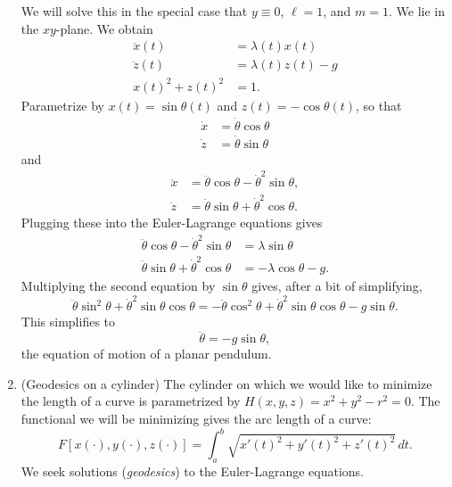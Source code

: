 \documentclass[11pt]{book}
\begin{document}
\begin{enumerate}
We will solve this in the special case that $y \equiv 0$, $\ell = 1$, and $m = 1$. We lie in the $xy$-plane. We obtain
\begin{align*}
\ddot{x}(t) &= \lambda(t)x(t) \\
\ddot{z}(t) &= \lambda(t)z(t) - g \\
x(t)^2 + z(t)^2 &= 1.
\end{align*}
Parametrize by $x(t) = \sin \theta(t)$ and $z(t) = -\cos \theta(t)$, so that
\begin{align*}
\dot{x} &= \dot{\theta} \cos \theta \\
\dot{z} &= \dot{\theta} \sin \theta
\end{align*}
and
\begin{align*}
\ddot{x} &= \ddot{\theta} \cos \theta - \dot{\theta}^2 \sin \theta, \\
\ddot{z} &= \ddot{\theta} \sin \theta + \dot{\theta}^2 \cos \theta.
\end{align*}
Plugging these into the Euler-Lagrange equations gives
\begin{align*}
\ddot{\theta} \cos \theta - \dot{\theta}^2 \sin \theta &= \lambda \sin \theta \\
\ddot{\theta} \sin \theta + \dot{\theta}^2 \cos\theta &= -\lambda \cos \theta - g.
\end{align*}
Multiplying the second equation by $\sin \theta$ gives, after a bit of simplifying,
\[
\ddot{\theta} \sin^2 \theta + \dot{\theta}^2 \sin \theta \cos \theta = -\ddot{\theta} \cos^2 \theta + \dot{\theta}^2 \sin \theta \cos \theta - g \sin \theta.
\]
This simplifies to
\[
\ddot{\theta} = -g \sin \theta,
\]
the equation of motion of a planar pendulum.

\item
(Geodesics on a cylinder) The cylinder on which we would like to minimize the length of a curve is parametrized by $H(x,y,z) = x^2 + y^2 - r^2 = 0$. The functional we will be minimizing gives the arc length of a curve:
\[
F[x(\cdot), y(\cdot), z(\cdot)] = \int_a^b \sqrt{x'(t)^2 + y'(t)^2 + z'(t)^2} \, dt.
\]
We seek solutions (\emph{geodesics}) to the Euler-Lagrange equations.


\end{enumerate}
\end{document}
